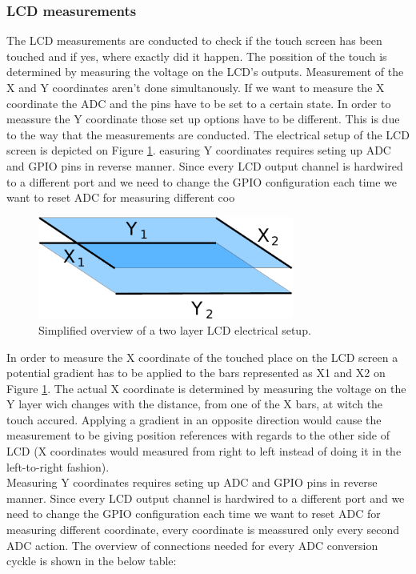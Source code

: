 \subsubsection{LCD measurements}
The LCD measurements are conducted to check if the touch screen has been touched and if yes, where exactly did it happen. The possition of the touch is determined by measuring the voltage on the LCD's outputs. Measurement of the X and Y coordinates aren't done simultanously. If we want to measure the X coordinate the ADC and the pins have to be set to a certain state. In order to meassure the Y coordinate those set up options have to be different. This is due to the way that the measurements are conducted. The electrical setup of the LCD screen is depicted on Figure \ref{fig:LCD_screen_measurement}.
easuring Y coordinates requires seting up ADC and GPIO pins in reverse manner. Since every LCD output channel is hardwired to a different port and we need to change the GPIO configuration each time we want to reset ADC for measuring different coo\begin{figure}
  \centering
  \includegraphics[width=0.75\textwidth]{img/used/adc_layers.pdf}               
  \caption{Simplified overview of a two layer LCD electrical setup.}
  \label{fig:LCD_screen_measurement}
\end{figure}

In order to measure the X coordinate of the touched place on the LCD screen a potential gradient has to be applied to the bars represented as X1 and X2 on Figure \ref{fig:LCD_screen_measurement}. The actual X coordinate is determined by measuring the voltage on the Y layer wich changes with the distance, from one of the X bars, at witch the touch accured. Applying a gradient in an opposite direction would cause the measurement to be giving position references with regards to the other side of LCD (X coordinates would measured from right to left instead of doing it in the left-to-right fashion). \\
Measuring Y coordinates requires seting up ADC and GPIO pins in reverse manner. Since every LCD output channel is hardwired to a different port and we need to change the GPIO configuration each time we want to reset ADC for measuring different coordinate, every coordinate is meassured only every second ADC action. The overview of connections needed for every ADC conversion cyckle is shown in the below table:

